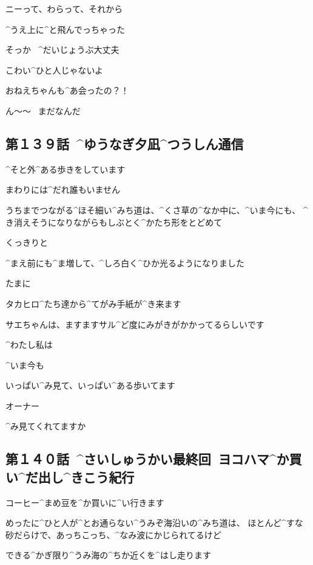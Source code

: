 \Sae ニーって、わらって、それから

\Sae ^{うえ}{上}に^{と}{飛}んでっちゃった

\page
\Makki そっか
\ ^{だいじょうぶ}{大丈夫}

\Makki こわい^{ひと}{人}じゃないよ

\page
\Sae おねえちゃんも^{あ}{会}ったの？！

\Alpha ん〜〜
\ まだなんだ


\subsection{第１３９話\ ^{ゆうなぎ}{夕凪}^{つうしん}{通信}}

\page[123]
\Alpha ^{そと}{外}^{ある}{歩}きをしています

\Alpha まわりには^{だれ}{誰}もいません

\page
\Alpha うちまでつながる^{ほそ}{細}い^{みち}{道}は、^{くさ}{草}の^{なか}{中}に、^{いま}{今}にも、
^{き}{消}えそうになりながらもしぶとく^{かたち}{形}をとどめて

\Alpha くっきりと

\Alpha ^{まえ}{前}にも^{ま}{増}して、^{しろ}{白}く^{ひか}{光}るようになりました

\page
\Alpha たまに

\Alpha タカヒロ^{たち}{達}から^{てがみ}{手紙}が^{き}{来}ます

\Alpha サエちゃんは、ますますサル^{ど}{度}にみがきがかかってるらしいです

\page[135]
\Alpha ^{わたし}{私}は

\Alpha ^{いま}{今}も

\Alpha いっぱい^{み}{見}て、いっぱい^{ある}{歩}いてます

\page
\Alpha オーナー

\Alpha ^{み}{見}てくれてますか


\subsection{第１４０話\ ^{さいしゅうかい}{最終回}\ ヨコハマ^{か}{買}い^{だ}{出}し^{きこう}{紀行}}

\page[140]
\Alpha コーヒー^{まめ}{豆}を^{か}{買}いに^{い}{行}きます

\Alpha めったに^{ひと}{人}が^{とお}{通}らない^{うみぞ}{海沿}いの^{みち}{道}は、
ほとんど^{すな}{砂}だらけで、あっちこっち、^{なみ}{波}にかじられてるけど

\Alpha できる^{かぎ}{限}り^{うみ}{海}の^{ちか}{近}くを^{はし}{走}ります

